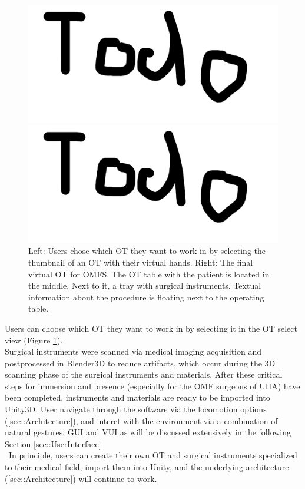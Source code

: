 \begin{figure}[ht]
  \centering
  \begin{minipage}{.5\textwidth}
    \centering
    \includegraphics[width=0.95\linewidth]{images/todo.png}
  \end{minipage}%
  \begin{minipage}{.5\textwidth}
    \centering
    \includegraphics[width=0.95\linewidth]{images/todo.png}
  \end{minipage}
  \caption{\label{fig::SceneSelect} Left: Users chose which OT they want to work in by selecting the thumbnail of an OT with their virtual hands. Right: The final virtual OT for OMFS. The OT table with the patient is located in the middle. Next to it, a tray with surgical instruments.
  Textual information about the procedure is floating next to the operating table.}
\end{figure}

Users can choose which OT they want to work in by selecting it in the OT select view (Figure \ref{fig::SceneSelect}).
\\ Surgical instruments were scanned via medical imaging acquisition and postprocessed in Blender3D to reduce artifacts, which occur during the 3D scanning phase of the surgical instruments and materials.
After these critical steps for immersion and presence (especially for the OMF surgeons of UHA) have been completed, instruments and materials are ready to be imported into Unity3D.
User navigate through the software via the locomotion options (\ref{sec::Architecture}), and interct with the environment via a combination of natural gestures, GUI and VUI as will be discussed extensively in the following Section \ref{sec::UserInterface}.
\\ In principle, users can create their own OT and surgical instruments specialized to their medical field, import them into Unity, and the underlying architecture (\ref{sec::Architecture}) will continue to work.